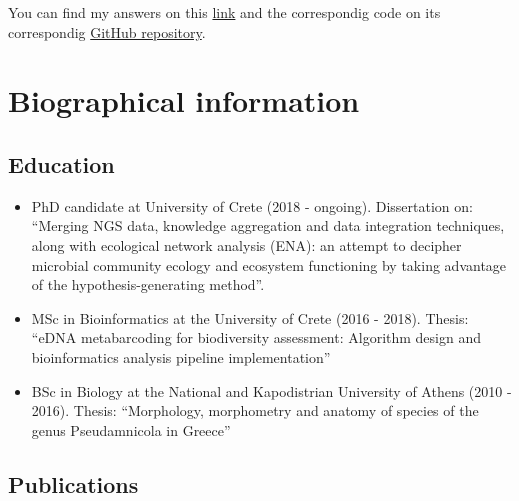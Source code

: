 \documentclass{article}
\begin{document}
You can find my answers on this \href{https://hariszaf.github.io/gsoc2021/}{link} 
and the correspondig code on its correspondig \href{https://github.com/hariszaf/gsoc2021}{GitHub repository}.



\section{Biographical information}
\subsection{Education}

\begin{itemize}

   \item PhD candidate at University of Crete (2018 - ongoing). Dissertation on: “Merging NGS data, knowledge aggregation and data integration techniques, along with ecological network analysis (ENA): an attempt to decipher microbial community ecology and ecosystem functioning by taking advantage of the hypothesis-generating method”.
   \item MSc in Bioinformatics at the University of Crete (2016 - 2018). Thesis: “eDNA metabarcoding for biodiversity assessment: Algorithm design and bioinformatics analysis pipeline implementation”
   \item BSc in Biology at the National and Kapodistrian University of Athens (2010 - 2016). Thesis: “Morphology, morphometry and anatomy of species of the genus Pseudamnicola in Greece” 

\end{itemize}


\subsection{Publications}
\end{document}
